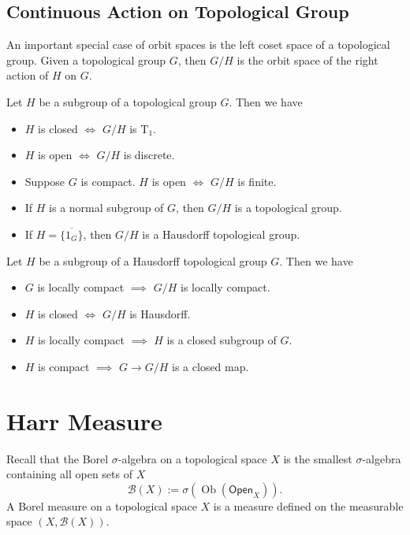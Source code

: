 \documentclass{report}
\begin{document}
\subsection{Continuous Action on Topological Group}
An important special case of orbit spaces is the left coset space of a topological group. Given a topological group $G$, then $G/H$ is the orbit space of the right action of $H$ on $G$.

\begin{proposition}{}{}
	Let $H$ be a subgroup of a topological group $G$. Then we have
	\begin{itemize}
		\item $H$ is closed $\iff$ $G/H$ is $\mathrm{T}_1$.
		\item $H$ is open $\iff$ $G/H$ is discrete.
		\item Suppose $G$ is compact. $H$ is open $\iff$ $G/H$ is finite.
		\item If $H$ is a normal subgroup of $G$, then $G/H$ is a topological group.
		\item If $H=\overline{\{1_G\}}$, then $G/H$ is a Hausdorff topological group.
	\end{itemize}
\end{proposition}

\begin{proposition}{}{}
	Let $H$ be a subgroup of a Hausdorff topological group $G$. Then we have
	\begin{itemize}
		\item $G$ is locally compact $\implies$ $G/H$ is locally compact.
		\item $H$ is closed $\iff$ $G/H$ is Hausdorff.
		\item $H$ is locally compact $\implies$ $H$ is a closed subgroup of $G$.
		\item $H$ is compact $\implies$ $G\to G/H$ is a closed map.
	\end{itemize}
\end{proposition}

\section{Harr Measure}
Recall that the Borel $\sigma$-algebra on a topological space $X$ is the smallest $\sigma$-algebra containing all open sets of $X$
\[
\mathcal{B}(X):=\sigma(\operatorname{Ob}\left(\mathsf{Open}_X\right)).
\]
A Borel measure on a topological space $X$ is a measure defined on the measurable space $(X, \mathcal{B}(X))$.
\end{document}
